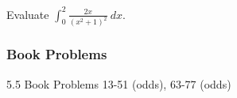 \documentclass[cal1spr16Lectures.tex]{subfiles}
\begin{document}
\begin{frame}
\begin{exe} Evaluate $\int_0^2 \frac{2x}{(x^2+1)^2}\ dx.$ \end{exe}
\end{frame}

\subsubsection{Book Problems}

\begin{frame}
\begin{block}{5.5 Book Problems} 
13-51 (odds), 63-77 (odds)
\end{block}
\end{frame}
\end{document}
